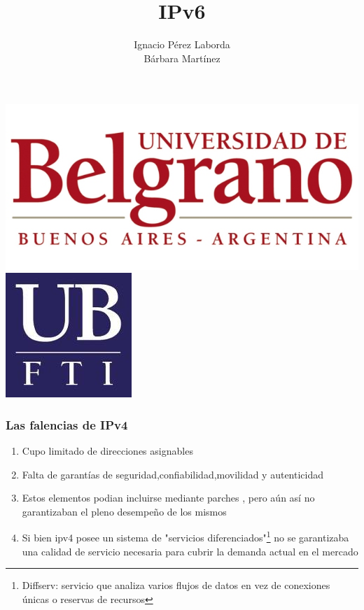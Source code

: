 \documentclass{beamer}
\title[Tecnologia]
{IPv6}
\subtitle{}
\author[Grupo 1] 
{Ignacio P\'erez Laborda\\B\'arbara Mart\'inez}
\institute[UB--FTI] 
{
  Facultad de Tecnolog\'ia Inform\'atica\\
  Universidad de Belgrano
}
\date[\today]
\begin{document}
\begin{frame}

\includegraphics[height=0.2\textheight]{ub2.jpg} \hspace*{6cm}
\includegraphics[height=0.19\textheight]{FTI.jpg}  
\\[-0.1cm]
\titlepage


\end{frame}

\begin{frame}
\frametitle{Las falencias de IPv4}

\begin{enumerate}[$*$]

	\item Cupo limitado de direcciones asignables
	\item Falta de garant\'ias de seguridad,confiabilidad,movilidad y autenticidad
	\item Estos elementos podian incluirse mediante parches , pero a\'un as\'i no garantizaban el pleno desempeño de los mismos
	\item Si bien ipv4 posee un sistema de "servicios diferenciados"\footnote[1]{Diffserv: servicio que analiza varios flujos de datos en vez de conexiones únicas o reservas de recursos } no se garantizaba una calidad de servicio necesaria para cubrir la demanda actual en el mercado
\end{enumerate}

\end{frame}
\end{document}
